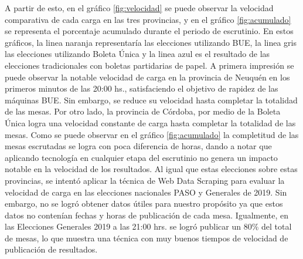 A partir de esto, en el gráfico \ref{fig:velocidad} se puede observar la velocidad comparativa de cada carga en las tres provincias, y en el gráfico \ref{fig:acumulado} se representa el porcentaje acumulado durante el periodo de escrutinio. En estos gráficos, la linea naranja representaría las elecciones utilizando BUE, la linea gris las elecciones utilizando Boleta Única y la linea azul es el resultado de las elecciones tradicionales con boletas partidarias de papel. \newline
A primera impresión se puede observar la notable velocidad de carga en la provincia de Neuquén en los primeros minutos de las 20:00 hs., satisfaciendo el objetivo de rapidez de las máquinas BUE. Sin embargo, se reduce su velocidad hasta completar la totalidad de las mesas. Por otro lado, la provincia de Córdoba, por medio de la Boleta Única logra una velocidad constante de carga hasta completar la totalidad de las mesas. Como se puede observar en el gráfico \ref{fig:acumulado} la completitud de las mesas escrutadas se logra con poca diferencia de horas, dando a notar que aplicando tecnología en cualquier etapa del escrutinio no genera un impacto notable en la velocidad de los resultados. 
Al igual que estas elecciones sobre estas provincias, se intentó aplicar la técnica de Web Data Scraping para evaluar la velocidad de carga en las elecciones nacionales PASO y Generales de 2019. Sin embargo, no se logró obtener datos útiles para nuestro propósito ya que estos datos no contenían fechas y horas de publicación de cada mesa. Igualmente, en las Elecciones Generales 2019 a las 21:00 hrs. se logró publicar un 80\% del total de mesas, lo que muestra una técnica con muy buenos tiempos de velocidad de publicación de resultados.
\newline


